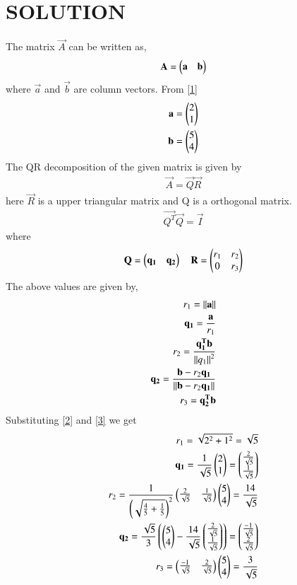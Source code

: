 \documentclass[journal,12pt,twocolumn]{IEEEtran}
\begin{document}
\section{SOLUTION}
The matrix $\vec{A}$ can be written as,
\begin{align}
\mathbf{A}=\begin{pmatrix}\mathbf{a}&\mathbf{b}\end{pmatrix}
\end{align}
where $\vec{a}$ and $\vec{b}$ are column vectors. From \eqref{1}
\begin{align}
\mathbf{a}=\begin{pmatrix}2\\1\end{pmatrix}\label{2}\\
\mathbf{b}=\begin{pmatrix}5\\4\end{pmatrix}\label{3}
\end{align}
The QR decomposition of the given matrix is given by
\begin{align}
\vec{A}=\vec{Q}\vec{R} \label{4}
\end{align}
here $\vec{R}$ is a upper triangular matrix and Q is a orthogonal matrix.
\begin{align}
\vec{Q^T}\vec{Q}=\vec{I}
\end{align}
where
\begin{align}
\mathbf{Q}=\begin{pmatrix}\mathbf{q_1}&\mathbf{q_2}\end{pmatrix}\quad
\mathbf{R}=\begin{pmatrix}r_1&r_2\\0&r_3\end{pmatrix} \label{5}
\end{align}
The above values are given by,
\begin{align}
r_1 = \left\lVert\mathbf{a}\right\rVert\\
\mathbf{q_1}=\frac{\mathbf{a}}{r_1}\\
r_2 = \frac{\mathbf{q_1^T}\mathbf{b}}{\left\lVert q_1\right\rVert^2}\\
\mathbf{q_2}=\frac{\mathbf{b}-r_2\mathbf{q_1}}{\left\lVert\mathbf{b}-r_2\mathbf{q_1}\right\rVert}\\
r_3 = \mathbf{q_2^T}\mathbf{b}
\end{align}
Substituting \eqref{2} and \eqref{3} we get
\begin{align}
r_1= \sqrt{2^2+1^2}= \sqrt{5}\\
\mathbf{q_1}= \frac{1}{\sqrt{5}}\begin{pmatrix}2\\1\end{pmatrix}=\begin{pmatrix}\frac{2}{\sqrt{5}}\\\frac{1}{\sqrt{5}}\end{pmatrix}\\
r_2=\frac{1}{\left(\sqrt{\frac{4}{5}+\frac{1}{5}}\right)^2}\begin{pmatrix}\frac{2}{\sqrt{5}}&\frac{1}{\sqrt{5}}\end{pmatrix}\begin{pmatrix}5\\4\end{pmatrix}= \frac{14}{\sqrt{5}}\\
\mathbf{q_2}=\frac{\sqrt{5}}{3}\left( \begin{pmatrix}5\\4\end{pmatrix}-\frac{14}{\sqrt{5}}\begin{pmatrix}\frac{2}{\sqrt{5}}\\\frac{1}{\sqrt{5}}\end{pmatrix}\right)= \begin{pmatrix}\frac{-1}{\sqrt{5}}\\\frac{2}{\sqrt{5}}\end{pmatrix}\\
r_3 = \begin{pmatrix}\frac{-1}{\sqrt{5}}&\frac{2}{\sqrt{5}}\end{pmatrix}\begin{pmatrix}5\\4\end{pmatrix}= \frac{3}{\sqrt{5}}
\end{align}
\end{document}
